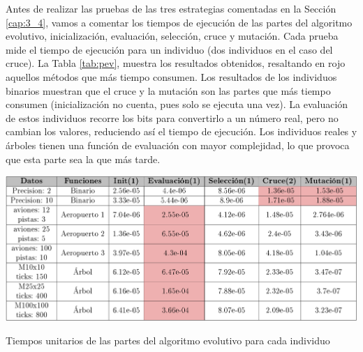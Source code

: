 Antes de realizar las pruebas de las tres estrategias comentadas en la Sección \ref{cap:3_4}, vamos a comentar los tiempos de ejecución de las partes del algoritmo evolutivo, inicialización, evaluación, selección, cruce y mutación. Cada prueba mide el tiempo de ejecución para un individuo (dos individuos en el caso del cruce). La Tabla \ref{tab:pev}, muestra los resultados obtenidos, resaltando en rojo aquellos métodos que más tiempo consumen. Los resultados de los individuos binarios muestran que el cruce y la mutación son las partes que más tiempo consumen (inicialización no cuenta, pues solo se ejecuta una vez). La evaluación de estos individuos recorre los bits para convertirlo a un número real, pero no cambian los valores, reduciendo así el tiempo de ejecución. Los individuos reales y árboles tienen una función de evaluación con mayor complejidad, lo que provoca que esta parte sea la que más tarde. 



\begin{table}[!h]
	\centering
	\includegraphics[width=1\textwidth]{images/chapter_4/tabla_pev}		
	\caption{Tiempos unitarios de las partes del algoritmo evolutivo para cada individuo}
	\label{tab:pev}
\end{table}

